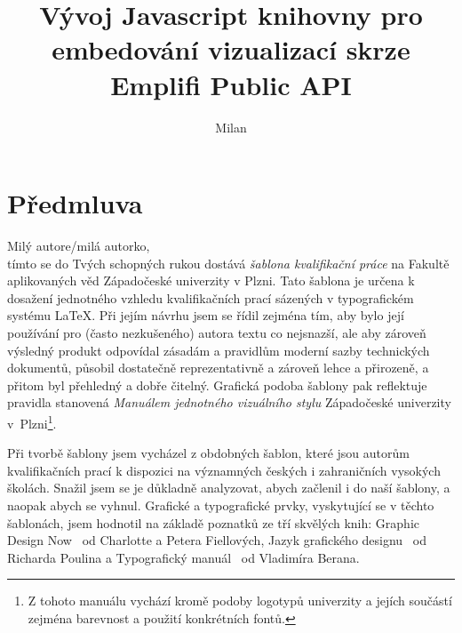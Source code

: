 \documentclass[czech, bc, kiv, he, iso690alph]{fasthesis}
\title{\texttt {}Vývoj Javascript knihovny pro embedování vizualizací skrze Emplifi Public API}
\author{Milan}{Janoch}{}{}
\begin{document}
\frontpages[tm] %
\tableofcontents
% 
%
\makeatletter%
\ifx\FASThesis@style\c@fullcolor%
\else%
\fi%
\makeatother%
%
%
%
%
\chapter*[Předmluva]{Předmluva}
Milý autore/milá autorko,\\[\baselineskip]
tímto se do Tvých schopných rukou dostává \emph{šablona kvalifikační práce} na Fakultě aplikovaných věd Západočeské univerzity v Plzni. Tato šablona je určena k dosažení jednotného vzhledu kvalifikačních prací sázených v typografickém systému \LaTeX. Při jejím návrhu jsem se řídil zejména tím, aby bylo její používání pro (často nezkušeného) autora textu co nejsnazší, ale aby zároveň výsledný produkt odpovídal zásadám a pravidlům moderní sazby technických dokumentů, působil dostatečně reprezentativně a zároveň lehce a přirozeně, a přitom byl přehledný a dobře čitelný. Grafická podoba šablony pak reflektuje pravidla stanovená \emph{Manuálem jednotného vizuálního stylu} Západočeské univerzity v~Plzni\footnote{Z tohoto manuálu vychází kromě podoby logotypů univerzity a jejích součástí zejména barevnost a použití konkrétních fontů.}.

Při tvorbě šablony jsem vycházel z obdobných šablon, které jsou autorům kvalifikačních prací k dispozici na významných českých i zahraničních vysokých školách. Snažil jsem se je důkladně analyzovat, abych  začlenil i do naší šablony, a naopak  abych se vyhnul. Grafické a typografické prvky, vyskytující se v těchto šablonách, jsem hodnotil na základě poznatků ze tří skvělých knih: Graphic Design Now~\cite{Fiells2005} od Charlotte a Petera Fiellových, Jazyk grafického designu~\cite{Poulin2012} od Richarda Poulina a Typografický manuál~\cite{Beran2016} od Vladimíra Berana.
\end{document}
